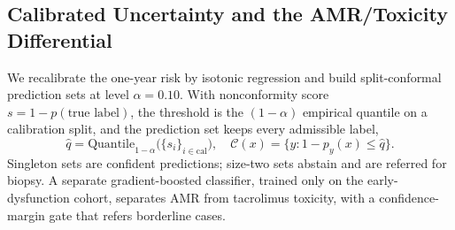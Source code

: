 \documentclass[journal]{IEEEtran}
\begin{document}
\subsection{Calibrated Uncertainty and the AMR/Toxicity Differential}
We recalibrate the one-year risk by isotonic regression and build split-conformal prediction sets at level $\alpha=0.10$. With nonconformity score $s=1-p(\text{true label})$, the threshold is the $(1-\alpha)$ empirical quantile on a calibration split, and the prediction set keeps every admissible label,
\begin{equation}
\hat q=\mathrm{Quantile}_{1-\alpha}\big(\{s_i\}_{i\in\mathrm{cal}}\big),\quad
\mathcal{C}(x)=\{y:1-p_y(x)\le\hat q\}.
\end{equation}
Singleton sets are confident predictions; size-two sets abstain and are referred for biopsy. A separate gradient-boosted classifier, trained only on the early-dysfunction cohort, separates AMR from tacrolimus toxicity, with a confidence-margin gate that refers borderline cases.
\end{document}
